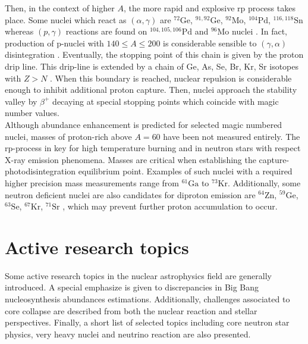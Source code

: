 \documentclass[openany]{book}
\begin{document}
Then, in the context of higher $A$, the more rapid and explosive rp process takes place. Some nuclei which react as $(\alpha, \gamma)$ are $\mathrm{{}^{72}Ge}$, $\mathrm{{}^{91,92}Ge}$, $\mathrm{{}^{92}Mo}$, $\mathrm{{}^{104}Pd}$, $\mathrm{{}^{116,118}Sn}$ whereas $(p, \gamma)$ reactions are found on $\mathrm{{}^{104,105,106}Pd}$ and  $\mathrm{{}^{96}Mo}$ nuclei \cite{harissopulos_spyrou_lagoyannis_zarkadas_becker_rolfs_strieder_hammer_dewald_zell_et_2005}. In fact, production of p-nuclei with $140 \le A \le 200$ is considerable sensible to $(\gamma, \alpha)$ disintegration \cite{kiss_szucs_gyurky_fulop_farkas_kertesz_somorjai_laubenstein_frohlich_rauscher_et_2011}. Eventually, the stopping point of this chain is given by the proton drip line. This drip-line is extended by a chain of Ge, As, Se, Br, Kr, Sr isotopes with $Z > N$ \cite{cai_chen_yuan_jian-jun_2022}.  When this boundary is reached, nuclear repulsion is considerable enough to inhibit additional proton capture. Then, nuclei approach the stability valley by $\beta^{+}$ decaying at special stopping points which coincide with magic number values. \\

Although abundance enhancement is predicted for selected magic numbered nuclei, masses of proton-rich above $A =60$ have been not measured entirely. The rp-process in key for high temperature burning and in neutron stars with respect X-ray emission phenomena. Masses are critical when establishing the capture-photodisintegration equilibrium point. Examples of such nuclei with a required higher precision mass measurements range from $\mathrm{{}^{61}Ga}$ to $\mathrm{{}^{73}Kr}$. Additionally, some neutron deficient nuclei are also candidates for diproton emission are  $\mathrm{{}^{64}Zn}$,  $\mathrm{{}^{59}Ge}$, $\mathrm{{}^{63}Se}$, $\mathrm{{}^{67}Kr}$, $\mathrm{{}^{71}Sr}$ \cite{brown_clement_schatz_volya_richter_2002}, which may prevent further proton accumulation to occur.

\section{Active research topics} \label{sec:activeResearch}

Some active research topics in the nuclear astrophysics field are generally introduced. A special emphasize is given to discrepancies in Big Bang nucleosynthesis abundances estimations. Additionally, challenges associated to core collapse are described from both the nuclear reaction and stellar perspectives. Finally, a short list of selected topics including core neutron star physics, very heavy nuclei and neutrino reaction are also presented. \\
\end{document}
